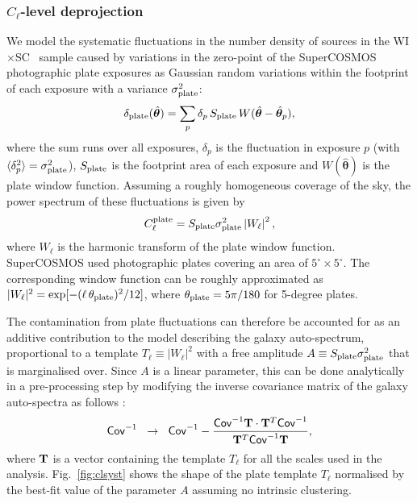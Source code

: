 \documentclass[useAMS,usenatbib]{mn2e}
\newcommand{\nv}{\hat{\boldsymbol{\theta}}}
\newcommand{\wisc}{WI$\times$SC}
\begin{document}
    \subsubsection{$C_\ell$-level deprojection}\label{sssec:methods.syst.plates}
      We model the systematic fluctuations in the number density of sources in the \wisc~ sample caused by variations in the zero-point of the SuperCOSMOS photographic plate exposures as Gaussian random variations within the footprint of each exposure with a variance $\sigma^2_{\rm plate}$:
      \begin{equation}
        \delta_{\rm plate}(\nv) = \sum_p \delta_p\,S_{\rm plate}\,W(\nv-\nv_p),
      \end{equation}
      where the sum runs over all exposures, $\delta_p$ is the fluctuation in exposure $p$ (with $\langle\delta_p^2\rangle=\sigma^2_{\rm plate}$), $S_{\rm plate}$ is the footprint area of each exposure and $W(\nv)$ is the plate window function. Assuming a roughly homogeneous coverage of the sky, the power spectrum of these fluctuations is given by
      \begin{equation}
        C_\ell^{\rm plate}=S_{\rm plate}\sigma_{\rm plate}^2\left|W_\ell\right|^2,
      \end{equation}
      where $W_\ell$ is the harmonic transform of the plate window function. SuperCOSMOS used photographic plates covering an area of $5^\circ\times5^\circ$. The corresponding window function can be roughly approximated as $|W_\ell|^2=\exp[-(\ell\,\theta_{\rm plate})^2/12]$, where $\theta_{\rm plate}=5\pi/180$ for 5-degree plates.
      
      The contamination from plate fluctuations can therefore be accounted for as an additive contribution to the model describing the galaxy auto-spectrum, proportional to a template $T_\ell\equiv|W_\ell|^2$ with a free amplitude $A\equiv S_{\rm plate}\sigma_{\rm plate}^2$ that is marginalised over. Since $A$ is a linear parameter, this can be done analytically in a pre-processing step by modifying the inverse covariance matrix of the galaxy auto-spectra as follows \citep{1992ApJ...398..169R}:
      \begin{equation}
        {\sf Cov}^{-1}\hspace{6pt}\rightarrow\hspace{6pt} {\sf Cov}^{-1}-\frac{{\sf Cov}^{-1}{\bf T}\cdot{\bf T}^T{\sf Cov}^{-1}}{{\bf T}^T{\sf Cov}^{-1}{\bf T}},
      \end{equation}
      where ${\bf T}$ is a vector containing the template $T_\ell$ for all the scales used in the analysis. Fig.\!~\ref{fig:clsyst} shows the shape of the plate template $T_\ell$ normalised by the best-fit value of the parameter $A$ assuming no intrinsic clustering.
\end{document}

